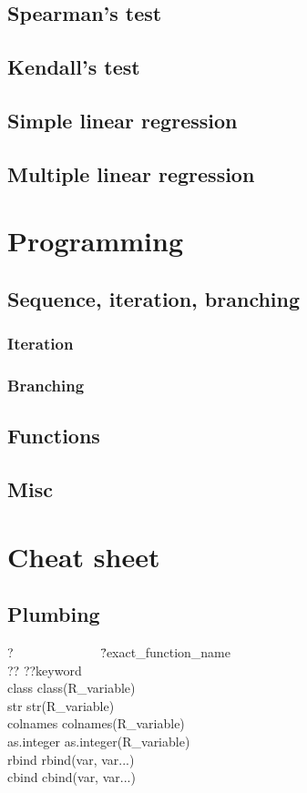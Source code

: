 \documentclass{report}
\begin{document}
	\section{Spearman’s test}
	\section{Kendall’s test}
	\section{Simple linear regression}
	\section{Multiple linear regression}

\chapter{Programming}
	\section{Sequence, iteration, branching}
		\subsection{Iteration}\label{subsec:iteration}
		\subsection{Branching}\label{subsec:branching}
	\section{Functions}
	\section{Misc}
\chapter{Cheat sheet}

	\section{Plumbing}
\begin{tabbing}
?~~~~~~~~~~~~~ \= ?exact\_function\_name \\
?? \> ??keyword \\
class \> class(R\_variable) \\
str \> str(R\_variable) \\
colnames \> colnames(R\_variable) \\
as.integer \> as.integer(R\_variable) \\
rbind \> rbind(var, var...) \\
cbind \> cbind(var, var...)
\end{tabbing}
\end{document}
